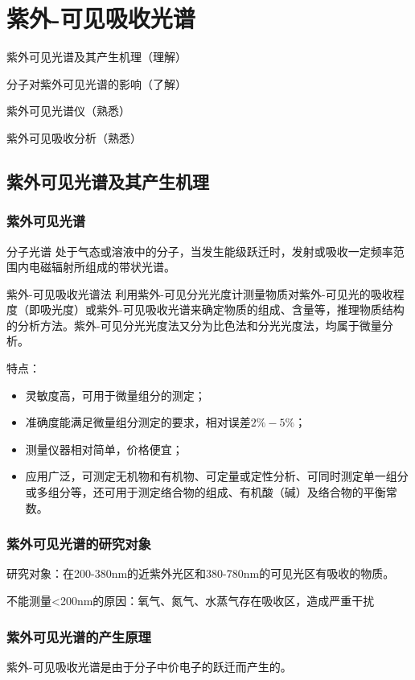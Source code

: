 \chapter{紫外-可见吸收光谱}
\begin{introduction}
    \item 紫外可见光谱及其产生机理（理解）
    \item 分子对紫外可见光谱的影响（了解）
    \item 紫外可见光谱仪（熟悉）
    \item 紫外可见吸收分析（熟悉）
\end{introduction}
\section{紫外可见光谱及其产生机理}
\subsection{紫外可见光谱}
\begin{definition*}{分子光谱}
    处于气态或溶液中的分子，当发生能级跃迁时，发射或吸收一定频率范围内电磁辐射所组成的带状光谱。
\end{definition*}
\begin{definition*}{紫外-可见吸收光谱法}
    利用紫外-可见分光光度计测量物质对紫外-可见光的吸收程度（即吸光度）或紫外-可见吸收光谱来确定物质的组成、含量等，推理物质结构的分析方法。紫外-可见分光光度法又分为比色法和分光光度法，均属于微量分析。
\end{definition*}
特点：
\begin{itemize}
    \item 灵敏度高，可用于微量组分的测定；
    \item 准确度能满足微量组分测定的要求，相对误差$2\%-5\%$；
    \item 测量仪器相对简单，价格便宜；
    \item 应用广泛，可测定无机物和有机物、可定量或定性分析、可同时测定单一组分或多组分等，还可用于测定络合物的组成、有机酸（碱）及络合物的平衡常数。
\end{itemize}
\subsection{紫外可见光谱的研究对象}
研究对象：在200-380nm的近紫外光区和380-780nm的可见光区有吸收的物质。
\begin{note}
    不能测量<200nm的原因：氧气、氮气、水蒸气存在吸收区，造成严重干扰
\end{note}
\subsection{紫外可见光谱的产生原理}
紫外-可见吸收光谱是由于分子中价电子的跃迁而产生的。
